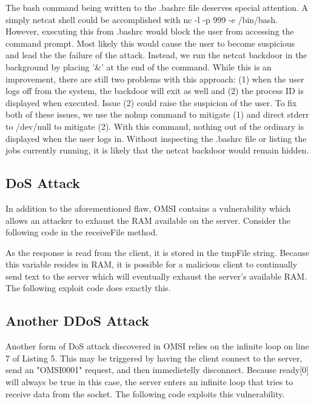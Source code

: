 

The bash command being written to the .bashrc file deserves special attention.  A simply netcat shell could be accomplished with nc -l -p 999 -e /bin/bash.  However, executing this from .bashrc would block the user from accessing the command prompt.  Most likely this would cause the user to become suspicious and lead the the failure of the attack.  Instead, we run the netcat backdoor in the background by placing '\&' at the end of the command.  While this is an improvement, there are still two problems with this approach: (1) when the user logs off from the system, the backdoor will exit as well and (2) the process ID is displayed when executed.  Issue (2) could raise the suspicion of the user.  To fix both of these issues, we use the nohup command to mitigate (1) and direct stderr to /dev/null to mitigate (2).  With this command, nothing out of the ordinary is displayed when the user logs in.  Without inspecting the .bashrc file or listing the jobs currently running, it is likely that the netcat backdoor would remain hidden.

\subsection*{DoS Attack}
In addition to the aforementioned flaw, OMSI contains a vulnerability which allows an attacker to exhaust the RAM available on the server.  Consider the following code in the receiveFile method.



As the response is read from the client, it is stored in the tmpFile string.  Because this variable resides in RAM, it is possible for a malicious client to continually send text to the server which will eventually exhaust the server's available RAM.  The following exploit code does exactly this.



\subsection*{Another DDoS Attack}
Another form of DoS attack discovered in OMSI relies on the infinite loop on line 7 of Listing 5.  This may be triggered by having the client connect to the server, send an "OMSI0001" request, and then immedietelly disconnect.  Because ready[0] will always be true in this case, the server enters an infinite loop that tries to receive data from the socket.  The following code exploits this vulnerability.  

